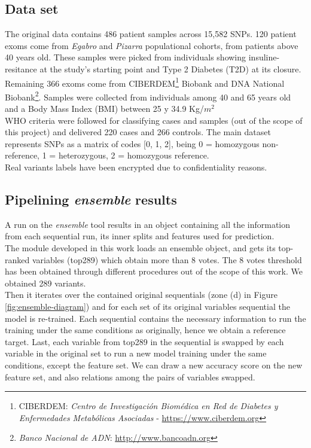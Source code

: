 \subsection{Data set}
The original data contains 486 patient samples across 15,582 SNPs. 120 patient exoms come from \emph{Egabro} and \emph{Pizarra} populational cohorts, from patients above 40 years old. These samples were picked from individuals showing insuline-resitance at the study's starting point and Type 2 Diabetes (T2D) at its closure. Remaining 366 exoms come from CIBERDEM\footnote{CIBERDEM: \emph{Centro de Investigación Biomédica en Red de Diabetes y Enfermedades Metabólicas Asociadas} - \url{https://www.ciberdem.org}} Biobank and DNA National Biobank\footnote{\emph{Banco Nacional de ADN}: \url{http://www.bancoadn.org}}. Samples were collected from individuals among 40 and 65 years old and a Body Mass Index (BMI) between 25 y 34.9 Kg/$m^{2}$
\\

WHO criteria were followed for classifying cases and samples (out of the scope of this project) and delivered 220 cases and 266 controls. The main dataset represents SNPs as a matrix of codes [0, 1, 2], being 0 = homozygous non-reference, 1 = heterozygous, 2 = homozygous reference. 
\\

Real variants labels have been encrypted due to confidentiality reasons.

\subsection{Pipelining \emph{ensemble} results}
\label{section:methods:pipeline}
A run on the \emph{ensemble} tool results in an object containing all the information from each sequential run, its inner splits and features used for prediction.
\\

The module developed in this work loads an ensemble object, and gets its top-ranked variables (top289) which obtain more than 8 votes. The 8 votes threshold has been obtained through different procedures out of the scope of this work. We obtained 289 variants.
\\

Then it iterates over the contained original sequentials (zone (d) in Figure \ref{fig:ensemble-diagram}) and for each set of its original variables sequential the model is re-trained. Each sequential contains the necessary information to run the training under the same conditions as originally, hence we obtain a reference target. Last, each variable from top289 in the sequential is swapped by each variable in the original set to run a new model training under the same conditions, except the feature set.
We can draw a new accuracy score on the new feature set, and also relations among the pairs of variables swapped.
\\

